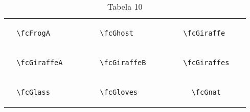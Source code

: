 \documentclass[x11names]{article}
\begin{document}
\begin{table}[H]
\begin{tabular}{|c|c|c|c|c|c|}
		&\multirow{5}{*}{	\fcFrogA	[scale=0.4]} & &\multirow{5}{*}{	\fcGhost	[scale=0.8]} & &\multirow{5}{*}{	\fcGiraffe	[scale=0.8]}\\	& & & & & \\	& & & & & \\	\verb|	\fcFrogA	| & & \verb|	\fcGhost	| & & \verb|	\fcGiraffe	| & \\	& & & & & \\	& & & & & \\	& & & & & \\	\hline									
		&\multirow{5}{*}{	\fcGiraffeA	[scale=0.8]} & &\multirow{5}{*}{	\fcGiraffeB	[scale=0.4]} & &\multirow{5}{*}{	\fcGiraffes	[scale=0.4]}\\	& & & & & \\	& & & & & \\	\verb|	\fcGiraffeA	| & & \verb|	\fcGiraffeB	| & & \verb|	\fcGiraffes	| & \\	& & & & & \\	& & & & & \\	& & & & & \\	\hline									
		&\multirow{5}{*}{	\fcGlass	[scale=0.8]} & &\multirow{5}{*}{	\fcGloves	[scale=0.2]} & &\multirow{5}{*}{	\fcGnat	[scale=0.8]}\\	& & & & & \\	& & & & & \\	\verb|	\fcGlass	| & & \verb|	\fcGloves	| & & \verb|	\fcGnat	| & \\	& & & & & \\	& & & & & \\	& & & & & \\		\hline 	\hline 	\end{tabular}	\caption{	Tabela 10	}\label{	Tab10	}\end{table}
\end{document}
